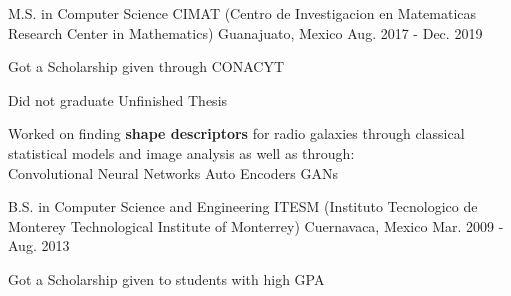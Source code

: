 

\begin{cventries}


\cventry
    {M.S. in Computer Science} %
    {CIMAT (Centro de Investigacion en Matematicas {\enskip\cdotp\enskip} Research Center in Mathematics)} %
    {Guanajuato, Mexico} %
    {Aug. 2017 - Dec. 2019} %
    {
    \begin{cvitems} %
        \item {Got a Scholarship given through CONACYT}
        \item {Did not graduate {\enskip\cdotp\enskip} Unfinished Thesis}
        \item {Worked on finding \textbf{shape descriptors} for radio galaxies through classical statistical models and image analysis as well as through:\\ 
        {\enskip\cdotp\enskip} Convolutional Neural Networks {\enskip\cdotp\enskip} Auto Encoders {\enskip\cdotp\enskip} GANs}
    \end{cvitems}
    }
  \cventry
    {B.S. in Computer Science and Engineering} %
    {ITESM ({Instituto Tecnologico de Monterey\enskip\cdotp\enskip} Technological Institute of Monterrey)} %
    {Cuernavaca, Mexico} %
    {Mar. 2009 - Aug. 2013} %
    {
      \begin{cvitems} %
        \item {Got a Scholarship given to students with high GPA}
      \end{cvitems}
    }

\end{cventries}